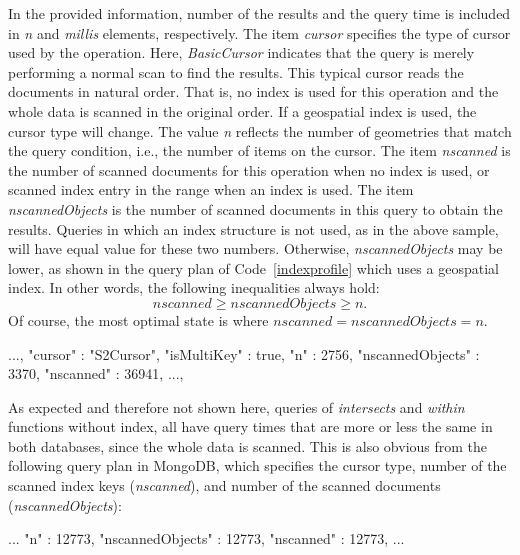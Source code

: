 \documentclass[a4paper,12pt]{article}
\begin{document}
In the provided information, number of the results and the query time is included in \textit{n} and \textit{millis} elements, respectively. The item \textit{cursor} specifies the type of cursor used by the operation. Here, \textit{BasicCursor} indicates that the query is merely performing a normal scan to find the results. This typical cursor reads the documents in natural order. That is, no index is used for this operation and the whole data is scanned in the original order. If a geospatial index is used, the cursor type will change. The value \textit{n} reflects the number of geometries that match the query condition, i.e., the number of items on the cursor. The item \textit{nscanned} is the number of scanned documents for this operation when no index is used, or scanned index entry in the range when an index is used. The item \textit{nscannedObjects} is the number of scanned documents in this query to obtain the results. Queries in which an index structure is not used, as in the above sample, will have equal value for these two numbers. Otherwise, \textit{nscannedObjects} may be lower, as shown in the query plan of Code~\ref{indexprofile} which uses a geospatial index. 
In other words, the following inequalities always hold:
$$nscanned\geq nscannedObjects\geq n.$$ 
Of course, the most optimal state is where $nscanned=nscannedObjects=n$. 
\vspace{10px}
\begin{fakeXML}[label=indexprofile,caption=Query profile in MongoDB when the related query uses geospatial index]
...,
"cursor" : "S2Cursor",
"isMultiKey" : true,
"n" : 2756,
"nscannedObjects" : 3370,
"nscanned" : 36941,
...,
\end{fakeXML}
\vspace{10px}


As expected and therefore not shown here, queries of \textit{intersects} and \textit{within} functions without index, all have query times that are more or less the same in both databases, since the whole data is scanned. This is also obvious from the following query plan in MongoDB, which specifies the cursor type, number of the scanned index keys (\textit{nscanned}), and number of the scanned documents (\textit{nscannedObjects}):
\vspace{10px}
\begin{fakeJSON}
...
"n" : 12773,
"nscannedObjects" : 12773,
"nscanned" : 12773,
...
\end{fakeJSON}
\vspace{10px}
\end{document}
